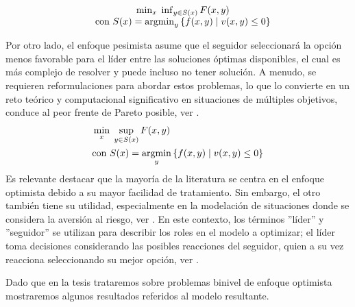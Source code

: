     \begin{equation}  \label{eq:EnfoqueOptimistaGeneral}
    \begin{matrix}
    & \min_{x} \; \inf_{y \in S(x)} F(x, y) \\
    & \text{con } S(x) = \operatorname*{argmin}_{y} \left\{ f(x, y) \mid v(x, y) \leq 0 \right\}
    \end{matrix}
    \end{equation}

Por otro lado, el enfoque pesimista asume que el seguidor seleccionará la opción menos favorable para el líder entre las soluciones óptimas disponibles, el cual es más complejo de resolver y puede incluso no tener solución. A menudo, se requieren reformulaciones para abordar estos problemas, lo que lo convierte en un reto teórico y computacional significativo en situaciones de múltiples objetivos, conduce al peor frente de Pareto posible, ver \cite{Sinha2017ARO}.
\begin{equation}
\begin{aligned}
& \min_{x} \; \sup_{y \in S(x)} F(x, y) \\
& \text{con } S(x) = \operatorname*{argmin}_{y} \left\{ f(x, y) \mid v(x, y) \leq 0 \right\}
\end{aligned}
\label{eq:EnfoquePesimistaGeneral}
\end{equation}
Es relevante destacar que la mayoría de la literatura se centra en el enfoque optimista debido a su mayor facilidad de tratamiento. Sin embargo, el otro también tiene su utilidad, especialmente en la modelación de situaciones donde se considera la aversión al riesgo, ver \cite{DempeyZemkoho2020}. En este contexto, los términos ''líder'' y ''seguidor'' se utilizan para describir los roles en el modelo a optimizar; el líder toma decisiones considerando las posibles reacciones del seguidor, quien a su vez reacciona seleccionando su mejor opción, ver \cite{Sinha2017ARO}.

Dado que en la tesis trataremos sobre problemas binivel de enfoque optimista mostraremos algunos resultados referidos al modelo resultante.

